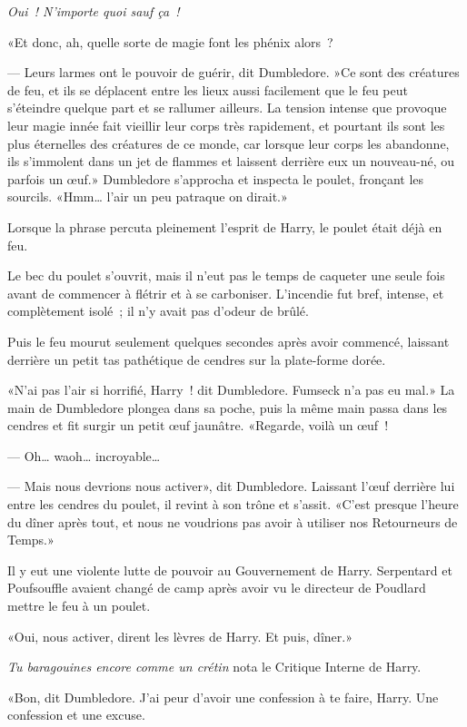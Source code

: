 \emph{Oui~! N'importe quoi sauf ça~!}

«Et donc, ah, quelle sorte de magie font les phénix alors~?

--- Leurs larmes ont le pouvoir de guérir, dit Dumbledore. »Ce sont des créatures de feu, et ils se déplacent entre les lieux aussi facilement que le feu peut s'éteindre quelque part et se rallumer ailleurs. La tension intense que provoque leur magie innée fait vieillir leur corps très rapidement, et pourtant ils sont les plus éternelles des créatures de ce monde, car lorsque leur corps les abandonne, ils s'immolent dans un jet de flammes et laissent derrière eux un nouveau-né, ou parfois un œuf.» Dumbledore s'approcha et inspecta le poulet, fronçant les sourcils. «Hmm… l'air un peu patraque on dirait.»

Lorsque la phrase percuta pleinement l'esprit de Harry, le poulet était déjà en feu.

Le bec du poulet s'ouvrit, mais il n'eut pas le temps de caqueter une seule fois avant de commencer à flétrir et à se carboniser. L'incendie fut bref, intense, et complètement isolé~; il n'y avait pas d'odeur de brûlé.

Puis le feu mourut seulement quelques secondes après avoir commencé, laissant derrière un petit tas pathétique de cendres sur la plate-forme dorée.

«N'ai pas l'air si horrifié, Harry~! dit Dumbledore. Fumseck n'a pas eu mal.» La main de Dumbledore plongea dans sa poche, puis la même main passa dans les cendres et fit surgir un petit œuf jaunâtre. «Regarde, voilà un œuf~!

--- Oh… waoh… incroyable…

--- Mais nous devrions nous activer», dit Dumbledore. Laissant l'œuf derrière lui entre les cendres du poulet, il revint à son trône et s'assit. «C'est presque l'heure du dîner après tout, et nous ne voudrions pas avoir à utiliser nos Retourneurs de Temps.»

Il y eut une violente lutte de pouvoir au Gouvernement de Harry. Serpentard et Poufsouffle avaient changé de camp après avoir vu le directeur de Poudlard mettre le feu à un poulet.

«Oui, nous activer, dirent les lèvres de Harry. Et puis, dîner.»

\emph{Tu baragouines encore comme un crétin} nota le Critique Interne de Harry.

«Bon, dit Dumbledore. J'ai peur d'avoir une confession à te faire, Harry. Une confession et une excuse.

